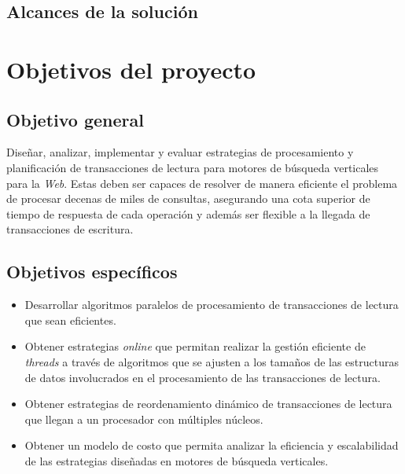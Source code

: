 \subsection{Alcances de la solución}
\label{intro:alcancesdelasolucion}

\section{Objetivos del proyecto}
\label{intro:objetivosysolucion}



\subsection{Objetivo general}
\label{intro:objetivogeneral}
Diseñar, analizar, implementar y evaluar estrategias de procesamiento y planificación de transacciones de lectura para motores de búsqueda verticales para la \textit{Web}. Estas deben ser capaces de resolver de manera eficiente el problema de procesar decenas de miles de consultas, asegurando una cota superior de tiempo de respuesta de cada operación y además ser flexible a la llegada de transacciones de escritura. 


\subsection{Objetivos específicos}
\label{intro:objetivosespecificos}
\begin{itemize}	
	\item Desarrollar algoritmos paralelos de procesamiento de transacciones de lectura que sean eficientes.
	
	\item Obtener estrategias \textit{online} que permitan realizar la gestión eficiente de \textit{threads} a través de algoritmos que se ajusten a los tamaños de las estructuras de datos involucrados en el procesamiento de las transacciones de lectura.
    
    \item Obtener estrategias de reordenamiento dinámico de transacciones de lectura que llegan a un procesador con múltiples núcleos.
    
    \item Obtener un modelo de costo que permita analizar la eficiencia y escalabilidad de las estrategias diseñadas en motores de búsqueda verticales.
\end{itemize}
